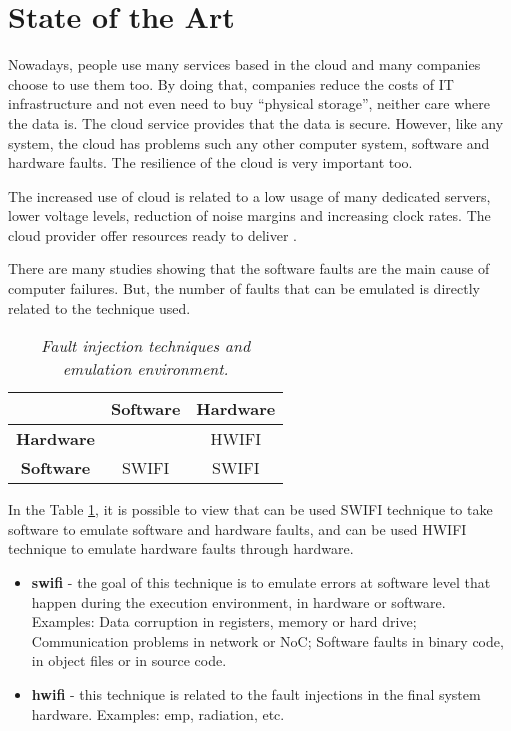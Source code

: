 \newpage
\section{State of the Art}

Nowadays, people use many services based in the cloud and many companies choose to use them too. By doing that, companies reduce the costs of IT infrastructure and not even need to buy ``physical storage'', neither care where the data is. The cloud service provides that the data is secure.
However, like any system, the cloud has problems such any other computer system, software and hardware faults. The resilience of the cloud is very important too.


The increased use of cloud is related to a low usage of many dedicated servers, lower voltage levels, reduction of noise margins and increasing clock rates. The cloud provider offer resources ready to deliver \cite{wolter2012resilience}.

There are many studies showing that the software faults\cite{avizzienisbasic} are the main cause of computer failures. But, the number of faults that can be emulated is directly related to the technique used.

\begin{table}[h]
\centering
\begin{tabular}{c|c|c}
         & \textbf{Software} & \textbf{Hardware} \\ \hline
\textbf{Hardware} &          & HWIFI    \\ \hline
\textbf{Software} & SWIFI    & SWIFI
\end{tabular}
\caption{\small \sl Fault injection techniques and emulation environment.}
\label{tab:swifi_hwifi}
\end{table}

In the Table \ref{tab:swifi_hwifi}, it is possible to view that can be used SWIFI technique to take software to emulate software and hardware faults, and can be used HWIFI technique to emulate hardware faults through hardware.

\begin{itemize}
	\item \textbf{\ac{swifi}} - the goal of this technique is to emulate errors at software level that happen during the execution environment, in hardware or software. Examples: Data corruption in registers, memory or hard drive; Communication problems in network or NoC; Software faults in binary code, in object files or in source code.

	\item \textbf{\ac{hwifi}} - this technique is related to the fault injections in the final system hardware. Examples: \ac{emp}, radiation, etc.

\end{itemize}

